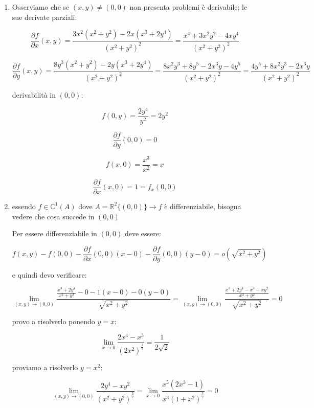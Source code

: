 \documentclass[11pt]{article}
\begin{document}
\begin{enumerate}
    \item Osserviamo che se $(x,y) \neq (0,0)$ non presenta problemi è derivabile; le sue derivate parziali:

        \[
            \frac{\partial f}{\partial x}(x,y) = \frac{3x^{2}(x^{2}+y^{2})-2x(x^{3}+2y^{4})}{(x^{2}+y^{2})^{2}}= \frac{x^{4}+3x^{2}y^{2}-4xy^{4}}{(x^{2}+y^{2})^{2}}
        \]

        \[
            \frac{\partial f}{\partial y}(x,y) = \frac{8y^{3}(x^{2}+y^{2}) - 2y(x^{3}+2y^{4})}{(x^{2}+y^{2})^{2}}= \frac{8x^{2}y^{3}+8y^{5}-2x^{3}y-4y^{5}}{(x^{2}+y^{2})^{2}} = \frac{4y^{5}+8x^{2}y^{3}-2x^{3}y}{(x^{2}+y^{2})^{2}}
        \]

        derivabilità in $(0,0)$:

        \[
            f(0,y) = \frac{2y^{4}}{y^{2}} = 2y^{2}
        \]

        \[
            \frac{\partial f}{\partial y}(0,0) = 0
        \]

        \[
            f(x,0) = \frac{x^{3}}{x^{2}} = x
        \]

        \[
            \frac{\partial f}{\partial x}(x,0) = 1 = f_x(0,0)
        \]

    \item 
        essendo $f \in \mathbb{C}^{1}(A)$ dove $A = \mathbb{R}^{2} \{(0,0)\} \rightarrow f \text{ è differenziabile}$, bisogna vedere che cosa succede in $(0,0)$

        Per essere differenziabile in $(0,0)$ deve essere:

        \[
            f(x,y) - f(0,0) - \frac{\partial f}{\partial x}(0,0) (x-0) - \frac{\partial f}{\partial y}(0,0) (y-0) = o(\sqrt{x^{2}+y^{2}})
        \]
        
        e quindi devo verificare:

        \[
            \lim_{ (x,y) \to (0,0) } \frac{ \frac{x^{3}+2y^{4}}{x^{2}+y^{2}}-0 -1(x-0) -0(y-0)}{\sqrt{x^{2}+y^{2}}} = \lim_{ (x,y) \to (0,0) } \frac{ \frac{x^{3}+2y^{4}- x^{3}-xy^{2}}{x^{2}+y^{2}}}{\sqrt{x^{2}+y^{2}}} = 0
        \]


        provo a risolverlo ponendo $y=x$:

        \[
            \lim_{ x \to 0 } \frac{2x^{4}-x^{3}}{(2x^{2})^{ \frac{3}{2}}} = \frac{1}{2 \sqrt{2}}
        \]

        proviamo a risolverlo $y=x^{2}$:

        \[
           \lim_{ (x,y) \to (0,0) }  \frac{2y^{4}-xy^{2}}{(x^{2}+y^{2})^{ \frac{3}{2}}} = \lim_{ x \to 0 } \frac{x^{5}(2x^{3}-1)}{x^{3}(1+x^{2})^{ \frac{3}{2}}} = 0
        \]

\end{enumerate}
\end{document}
